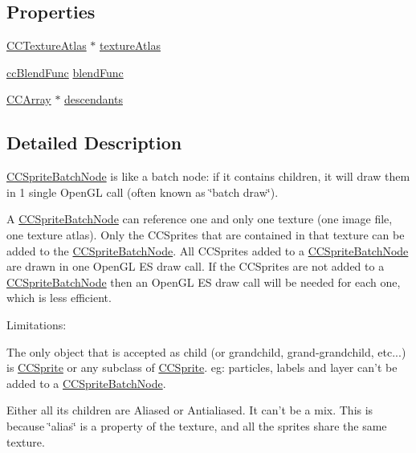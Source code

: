 \subsection*{Properties}
\begin{DoxyCompactItemize}
\item 
\hyperlink{interface_c_c_texture_atlas}{C\-C\-Texture\-Atlas} $\ast$ \hyperlink{interface_c_c_sprite_batch_node_a490e279dec5d00f1101a27c9e020bb74}{texture\-Atlas}
\item 
\hyperlink{cc_types_8h_a8c19c6f67219ecc0a6e4740cc046008d}{cc\-Blend\-Func} \hyperlink{interface_c_c_sprite_batch_node_a80261f62d72cb2181c635a7225ac2ee4}{blend\-Func}
\item 
\hyperlink{interface_c_c_array}{C\-C\-Array} $\ast$ \hyperlink{interface_c_c_sprite_batch_node_ab80aa33e4b89d43d183a1e4beecdbb41}{descendants}
\end{DoxyCompactItemize}


\subsection{Detailed Description}
\hyperlink{interface_c_c_sprite_batch_node}{C\-C\-Sprite\-Batch\-Node} is like a batch node\-: if it contains children, it will draw them in 1 single Open\-G\-L call (often known as \char`\"{}batch draw\char`\"{}).

A \hyperlink{interface_c_c_sprite_batch_node}{C\-C\-Sprite\-Batch\-Node} can reference one and only one texture (one image file, one texture atlas). Only the C\-C\-Sprites that are contained in that texture can be added to the \hyperlink{interface_c_c_sprite_batch_node}{C\-C\-Sprite\-Batch\-Node}. All C\-C\-Sprites added to a \hyperlink{interface_c_c_sprite_batch_node}{C\-C\-Sprite\-Batch\-Node} are drawn in one Open\-G\-L E\-S draw call. If the C\-C\-Sprites are not added to a \hyperlink{interface_c_c_sprite_batch_node}{C\-C\-Sprite\-Batch\-Node} then an Open\-G\-L E\-S draw call will be needed for each one, which is less efficient.

Limitations\-:
\begin{DoxyItemize}
\item The only object that is accepted as child (or grandchild, grand-\/grandchild, etc...) is \hyperlink{class_c_c_sprite}{C\-C\-Sprite} or any subclass of \hyperlink{class_c_c_sprite}{C\-C\-Sprite}. eg\-: particles, labels and layer can't be added to a \hyperlink{interface_c_c_sprite_batch_node}{C\-C\-Sprite\-Batch\-Node}.
\item Either all its children are Aliased or Antialiased. It can't be a mix. This is because \char`\"{}alias\char`\"{} is a property of the texture, and all the sprites share the same texture.
\end{DoxyItemize}

